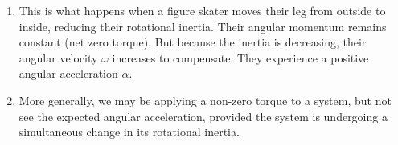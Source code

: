 \begin{enumerate}
  \item This is what happens when a figure skater moves their leg from
  outside to inside, reducing their rotational inertia. Their angular
  momentum remains constant (net zero torque). But because the inertia
  is decreasing, their angular velocity $\omega$ increases to
  compensate. They experience a positive angular acceleration $\alpha$.

  \item More generally, we may be applying a non-zero torque to a
  system, but not see the expected angular acceleration, provided the
  system is undergoing a simultaneous change in its rotational inertia.
\end{enumerate}
